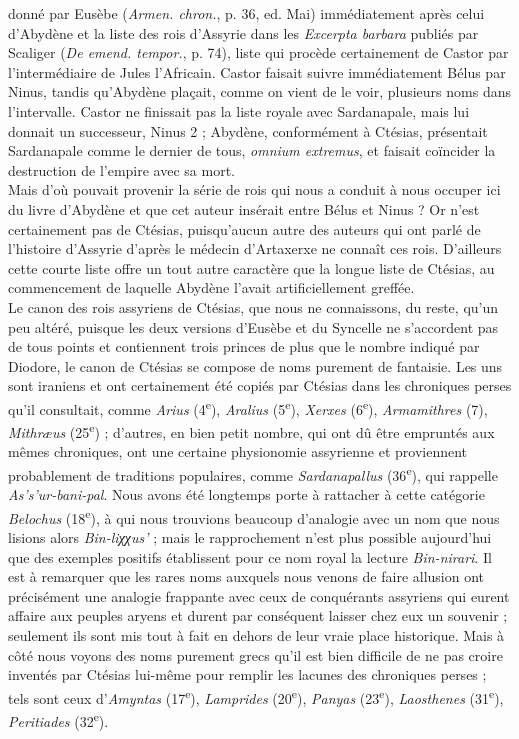 \documentclass[a4paper, 11pt, oneside, landscape]{article}
\begin{document}
donné par Eusèbe (\emph{Armen. chron.}, p. 36, ed. Mai) immédiatement après celui d'Abydène et la liste des rois d'Assyrie dans les \emph{Excerpta barbara} publiés par Scaliger (\emph{De emend. tempor.}, p. 74), liste qui procède certainement de Castor par l'intermédiaire de Jules l'Africain. Castor faisait suivre immédiatement Bélus par Ninus, tandis qu'Abydène plaçait, comme on vient de le voir, plusieurs noms dans l'intervalle. Castor ne finissait pas la liste royale avec Sardanapale, mais lui donnait un successeur, Ninus 2 ; Abydène, conformément à Ctésias, présentait Sardanapale comme le dernier de tous, \emph{omnium extremus}, et faisait coïncider la destruction de l'empire avec sa mort.\\\hspace*{5mm}Mais d'où pouvait provenir la série de rois qui nous a conduit à nous occuper ici du livre d'Abydène et que cet auteur insérait entre Bélus et Ninus ? Or n'est certainement pas de Ctésias, puisqu'aucun autre des auteurs qui ont parlé de l'histoire d'Assyrie d'après le médecin d'Artaxerxe ne connaît ces rois. D'ailleurs cette courte liste offre un tout autre caractère que la longue liste de Ctésias, au commencement de laquelle Abydène l'avait artificiellement greffée.\\\hspace*{5mm}Le canon des rois assyriens de Ctésias, que nous ne connaissons, du reste, qu'un peu altéré, puisque les deux versions d'Eusèbe et du Syncelle ne s'accordent pas de tous points et contiennent trois princes de plus que le nombre indiqué par Diodore, le canon de Ctésias se compose de noms purement de fantaisie. Les uns sont iraniens et ont certainement été copiés par Ctésias dans les chroniques perses qu'il consultait, comme \emph{Arius} (4\textsuperscript{e}), \emph{Aralius} (5\textsuperscript{e}), \emph{Xerxes} (6\textsuperscript{e}), \emph{Armamithres} (7), \emph{Mithræus} (25\textsuperscript{e}) ; d'autres, en bien petit nombre, qui ont dû être empruntés aux mêmes chroniques, ont une certaine physionomie assyrienne et proviennent probablement de traditions populaires, comme \emph{Sardanapallus} (36\textsuperscript{e}), qui rappelle \emph{As's'ur-bani-pal}. Nous avons été longtemps porte à rattacher à cette catégorie \emph{Belochus} (18\textsuperscript{e}), à qui nous trouvions beaucoup d'analogie avec un nom que nous lisions alors \emph{Bin-liχχus'} ; mais le rapprochement n'est plus possible aujourd'hui que des exemples positifs établissent pour ce nom royal la lecture \emph{Bin-nirari}. Il est à remarquer que les rares noms auxquels nous venons de faire allusion ont précisément une analogie frappante avec ceux de conquérants assyriens qui eurent affaire aux peuples aryens et durent par conséquent laisser chez eux un souvenir ; seulement ils sont mis tout à fait en dehors de leur vraie place historique. Mais à côté nous voyons des noms purement grecs qu'il est bien difficile de ne pas croire inventés par Ctésias lui-même pour remplir les lacunes des chroniques perses ; tels sont ceux d'\emph{Amyntas} (17\textsuperscript{e}), \emph{Lamprides} (20\textsuperscript{e}), \emph{Panyas} (23\textsuperscript{e}), \emph{Laosthenes} (31\textsuperscript{e}), \emph{Peritiades} (32\textsuperscript{e}). 
\end{document}
